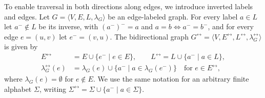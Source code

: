 To enable traversal in both directions along edges, we introduce inverted labels and edges.
Let $G = \langle V, E, L, \lambda_G \rangle$ be an edge-labeled graph.
For every label $a \in L$ let $a^- \notin L$ be its inverse, with $(a^-)^- = a$ and $a = b \Leftrightarrow a^- = b^-$, and for every edge $e = (u, v)$ let $e^- = (v, u)$.
The bidirectional graph $G^\leftrightarrow = \langle V, E^\leftrightarrow, L^\leftrightarrow, \lambda_G^\leftrightarrow \rangle$ is given by
\begin{align*}
	E^\leftrightarrow &= E \cup \{ e^- \mid e \in E \}, \qquad L^\leftrightarrow = L \cup \{ a^- \mid a \in L \}, \\
	\lambda_G^\leftrightarrow(e) &= \lambda_G(e) \cup \{ a^- \mid a \in \lambda_G(e^-) \} \quad \text{for } e \in E^\leftrightarrow,
\end{align*}
where $\lambda_G(e) = \emptyset$ for $e \notin E$.
We use the same notation for an arbitrary finite alphabet $\Sigma$, writing $\Sigma^\leftrightarrow = \Sigma \cup \{ a^- \mid a \in \Sigma \}$.
%

